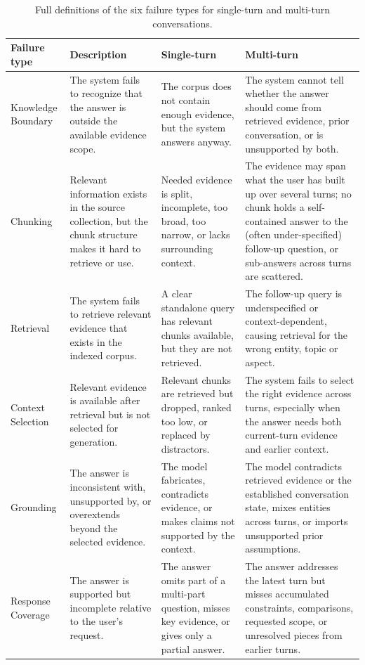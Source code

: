 \documentclass[11pt]{article}
\begin{document}
\begin{table}[H]
\centering\small
\begin{tabularx}{\textwidth}{@{}p{2.2cm} L L L@{}}
\toprule
\textbf{Failure type} & \textbf{Description} & \textbf{Single-turn} & \textbf{Multi-turn} \\
\midrule
Knowledge Boundary & The system fails to recognize that the answer is outside the available evidence scope. & The corpus does not contain enough evidence, but the system answers anyway. & The system cannot tell whether the answer should come from retrieved evidence, prior conversation, or is unsupported by both. \\
\addlinespace
Chunking & Relevant information exists in the source collection, but the chunk structure makes it hard to retrieve or use. & Needed evidence is split, incomplete, too broad, too narrow, or lacks surrounding context. & The evidence may span what the user has built up over several turns; no chunk holds a self-contained answer to the (often under-specified) follow-up question, or sub-answers across turns are scattered. \\
\addlinespace
Retrieval & The system fails to retrieve relevant evidence that exists in the indexed corpus. & A clear standalone query has relevant chunks available, but they are not retrieved. & The follow-up query is underspecified or context-dependent, causing retrieval for the wrong entity, topic or aspect. \\
\addlinespace
Context Selection & Relevant evidence is available after retrieval but is not selected for generation. & Relevant chunks are retrieved but dropped, ranked too low, or replaced by distractors. & The system fails to select the right evidence across turns, especially when the answer needs both current-turn evidence and earlier context. \\
\addlinespace
Grounding & The answer is inconsistent with, unsupported by, or overextends beyond the selected evidence. & The model fabricates, contradicts evidence, or makes claims not supported by the context. & The model contradicts retrieved evidence or the established conversation state, mixes entities across turns, or imports unsupported prior assumptions. \\
\addlinespace
Response Coverage & The answer is supported but incomplete relative to the user's request. & The answer omits part of a multi-part question, misses key evidence, or gives only a partial answer. & The answer addresses the latest turn but misses accumulated constraints, comparisons, requested scope, or unresolved pieces from earlier turns. \\
\bottomrule
\end{tabularx}
\caption{Full definitions of the six failure types for single-turn and multi-turn conversations.}
\label{tab:app-failures}
\end{table}
\end{document}
